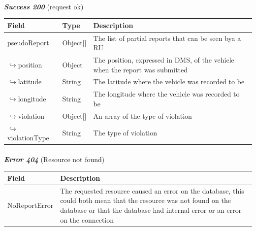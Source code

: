						\paragraph{}
							\textcolor{myGreen}{\textit{\textbf{Success 200}}} (request ok)
							\vspace{-2mm}
							\begin{table}[!h]
								\begin{tabular}{L{0.3\textwidth}L{0.15\textwidth}L{0.43\textwidth}}
									\toprule
									\textbf{Field} & \textbf{Type} & \textbf{Description} \\
									\midrule
									pseudoReport & Object[] & The list of partial reports that can be seen bya a RU \\
									\hspace{2.5mm}$\hookrightarrow$position & Object & The position, expressed in DMS, of the vehicle when the report was submitted  \\
									\hspace{6.5mm}$\hookrightarrow$latitude & String & The latitude where the vehicle was recorded to be \\
									\hspace{6.5mm}$\hookrightarrow$longitude & String & The longitude where the vehicle was recorded to be \\
									\hspace{2.5mm}$\hookrightarrow$violation & Object[] & An array of the type of violation \\
									\hspace{6.5mm}$\hookrightarrow$violationType & String & The type of violation \\
								 	\bottomrule
								\end{tabular}
							\end{table}
						\paragraph{}
							\textcolor{myRed}{\textit{\textbf{Error 404}}} (Resource not found)
							\vspace{-2mm}
							\begin{table}[!h]
								\begin{tabular}{L{0.3\textwidth}L{0.62\textwidth}}
									\toprule
									\textbf{Field} & \textbf{Description} \\
									\midrule
								  	 NoReportError & The requested resource caused an error on the database, this could both mean that the resource was not found on the database or that the database had internal error or an error on the connection \\
								 	\bottomrule
								\end{tabular}
							\end{table}
						
